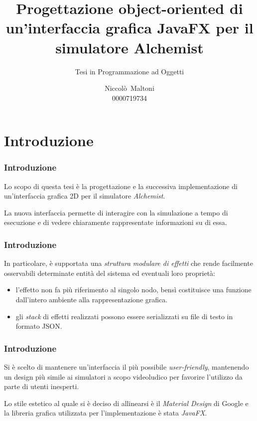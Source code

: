 \documentclass[%
]{beamer}
\title[Nuova GUI Alchemist in JavaFX]{%
    Progettazione object-oriented di un'interfaccia grafica %
    JavaFX per il simulatore Alchemist
}
\subtitle{Tesi in Programmazione ad Oggetti}
\author[Niccolò~Maltoni]{Niccolò~Maltoni\\0000719734}
\date{%
}
\institute[%
]{%
    Alma Mater Studiorum - Università di Bologna\\%
    Campus di Cesena%
}
\newcommand{\engEmph}[1] {\emph{\foreignlanguage{english}#1}}
\begin{document}
    \begin{frame}
        \titlepage
    \end{frame}

    \section{Introduzione}\label{sec:intro}
    \begin{frame}
        \frametitle{Introduzione}
        Lo scopo di questa tesi è la progettazione e la successiva implementazione di un'interfaccia grafica 2D per il simulatore \emph{Alchemist}.

        \medskip %
        \pause

        La nuova interfaccia permette di interagire con la simulazione a tempo di esecuzione e di vedere chiaramente rappresentate informazioni su di essa.
    \end{frame}

    \begin{frame}
        \frametitle{Introduzione}
        In particolare, è supportata una \emph{struttura modulare di effetti} che rende facilmente osservabili determinate entità del sistema ed eventuali loro proprietà:

        \pause

        \begin{itemize}
            \item<1->
                l'effetto non fa più riferimento al singolo nodo, bensì costituisce una funzione dall'intero ambiente alla rappresentazione grafica.
            \item<2->
                gli \engEmph{stack} di effetti realizzati possono essere serializzati su file di testo in formato JSON.
        \end{itemize}
    \end{frame}

    \begin{frame}
        \frametitle{Introduzione}
        Si è scelto di mantenere un'interfaccia il più possibile \engEmph{user-friendly}, mantenendo un design più simile ai simulatori a scopo videoludico per favorire l'utilizzo da parte di utenti inesperti.

        \medskip
        \pause

        Lo stile estetico al quale si è deciso di allinearsi è il \emph{Material Design} di Google e la libreria grafica utilizzata per l'implementazione è stata \emph{JavaFX}.
    \end{frame}
\end{document}

